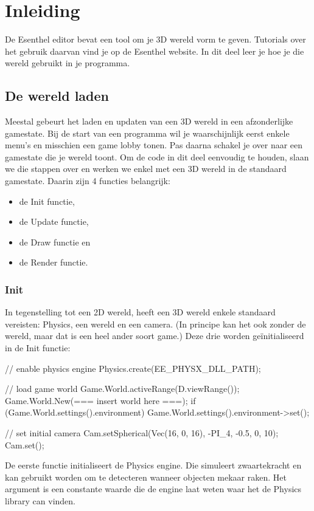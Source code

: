 \chapter{Inleiding}
De Esenthel editor bevat een tool om je 3D wereld vorm te geven. Tutorials over het gebruik daarvan vind je op de Esenthel website. In dit deel leer je hoe je die wereld gebruikt in je programma.

\section{De wereld laden}
Meestal gebeurt het laden en updaten van een 3D wereld in een afzonderlijke gamestate. Bij de start van een programma wil je waarschijnlijk eerst enkele menu's en misschien een game lobby tonen. Pas daarna schakel je over naar een gamestate die je wereld toont. Om de code in dit deel eenvoudig te houden, slaan we die stappen over en werken we enkel met een 3D wereld in de standaard gamestate. Daarin zijn 4 functies belangrijk:

\begin{itemize}
	\item de Init functie,
	\item de Update functie,
	\item de Draw functie en
	\item de Render functie.
\end{itemize}

\subsection{Init}
In tegenstelling tot een 2D wereld, heeft een 3D wereld enkele standaard vereisten: Physics, een wereld en een camera. (In principe kan het ook zonder de wereld, maar dat is een heel ander soort game.) Deze drie worden ge\"initialiseerd in de Init functie:

\begin{code}
// enable physics engine
Physics.create(EE_PHYSX_DLL_PATH);
   
// load game world
Game.World.activeRange(D.viewRange());
Game.World.New(=== insert world here ===);
if (Game.World.settings().environment) {
  Game.World.settings().environment->set();
}
	
// set initial camera
Cam.setSpherical(Vec(16, 0, 16), -PI_4, -0.5, 0, 10);
Cam.set();
\end{code}

De eerste functie initialiseert de Physics engine. Die simuleert zwaartekracht en kan gebruikt worden om te detecteren wanneer objecten mekaar raken. Het argument  is een constante waarde die de engine laat weten waar het de Physics library can vinden.

